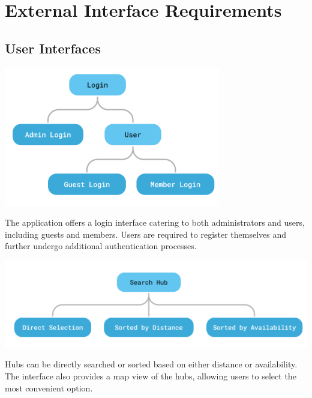 \documentclass{scrreprt}
\begin{document}
\section{External Interface Requirements}
\subsection{User Interfaces}

\begin{center}
    \includegraphics*{login-interface.png}
\end{center}
The application offers a login interface catering to both administrators and users, including guests and members. Users are required to register themselves and further undergo additional authentication processes.

\begin{center}
    \includegraphics*{search-interface.png}
\end{center}
Hubs can be directly searched or sorted based on either distance or availability. The interface also provides a map view of the hubs, allowing users to select the most convenient option.
\end{document}
